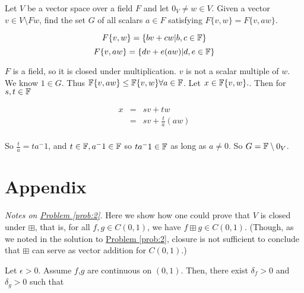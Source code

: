 \begin{problem}[Golan 105]

Let $V$ be a vector space over a field $F$ and let $0_V \neq w \in V$.  Given a
vector $v \in V \setminus Fw$, find the set $G$ of all scalars $a \in F$
satisfying $F\{v, w\} = F\{v, aw\}$.

\end{problem}
\smallskip
\begin{solution}

$$F\{v,w\} = \{bv + cw | b,c \in \mathbb{F} \} $$
$$F\{v,aw\} = \{dv + e(aw) | d,e \in \mathbb{F}\}$$

$F$ is a field, so it is closed under multiplication. $v$ is not a scalar multiple of $w$. We know $1 \in G$. Thus $\mathbb{F}\{v,aw\} \leq \mathbb{F}\{v,w\} \forall a \in \mathbb{F}$. Let $x \in \mathbb{F}\{v,w\}.$. Then for $s,t \in \mathbb{F}$

\begin{eqnarray*}
x & = & sv + tw  \\
  & = & sv + \frac{t}{a}(aw) \\
\end{eqnarray*}

So $\frac{t}{a} = ta^-1$, and $t \in \mathbb{F}, a^-1 \in \mathbb{F}$ so $ta^-1 \in \mathbb{F}$ as long as $a \neq 0$. So $G = \mathbb{F} \setminus 0_V$.
\end{solution}
\probskip


\section*{Appendix}
\label{appendix}

{\it Notes on \hyperref[prob:2]{Problem \ref*{prob:2}}.}
Here we show how one could prove that $V$ is closed under $\boxplus$, that is, 
for all $f, g \in C(0,1)$, we have $f \boxplus g \in C(0,1)$. (Though, as we
noted in the solution to
\hyperref[prob:2]{Problem \ref*{prob:2}}, closure is not sufficient
to conclude that $\boxplus$ can serve as vector addition for $C(0,1)$.)

Let $\epsilon > 0$. Assume $f$,$g$ are continuous on $(0,1)$. Then, there exist $\delta_f > 0$ and $\delta_g > 0$ such that

